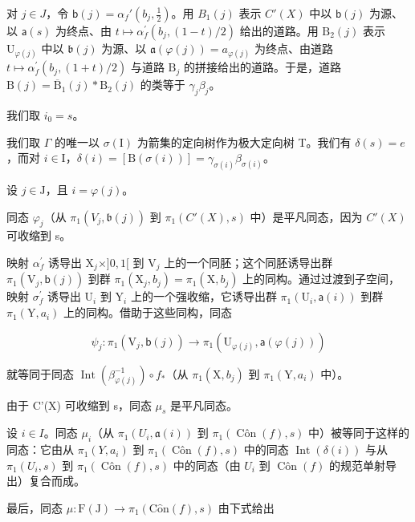 对 \(j \in J\)，令 \(\mathsf{b}(j) = \alpha_f'(b_j, \frac{1}{2})\)。用 \(B_1(j)\) 表示 \(C'(X)\) 中以 \(\mathsf{b}(j)\) 为源、以 \(\mathsf{a}(s)\) 为终点、由 \(t \mapsto \alpha_{f}^{\prime}(b_{j}, (1 - t)/2)\) 给出的道路。用 \(\mathrm{B}_{2}(j)\) 表示 \(\mathrm{U}_{\varphi(j)}\) 中以 \(\mathfrak{b}(j)\) 为源、以 \(\mathfrak{a}(\varphi(j)) = a_{\varphi(j)}\) 为终点、由道路 \(t \mapsto \alpha_{f}^{\prime}(b_{j}, (1 + t)/2)\) 与道路 \(\mathrm{B}_{j}\) 的拼接给出的道路。于是，道路 \(\mathrm{B}(j) = \overline{\mathrm{B}}_{1}(j) * \mathrm{B}_{2}(j)\) 的类等于 \(\gamma_{j}\beta_{j}\)。

我们取 \(i_{0}=s\)。

我们取 \(\Gamma\) 的唯一以 \(\sigma(\mathrm{I})\) 为箭集的定向树作为极大定向树 T。我们有 \(\delta(s) = e\)，而对 \(i \in \mathrm{I}\)，\(\delta(i) = [\mathrm{B}(\sigma(i))] = \gamma_{\sigma(i)}\beta_{\sigma(i)}\)。

设 \(j \in \mathrm{J}\)，且 \(i = \varphi(j)\)。

同态 \(\varphi_{j}\)（从 \(\pi_1(V_j, \mathfrak{b}(j))\) 到 \(\pi_1(C'(X), s)\) 中）是平凡同态，因为 \(C'(X)\) 可收缩到 s。

映射 \(\alpha_{f}^{\prime}\) 诱导出 \(\mathrm{X}_{j} \times ]0,1[\) 到 \(\mathrm{V}_{j}\) 上的一个同胚；这个同胚诱导出群 \(\pi_{1}(\mathrm{V}_{j},\mathsf{b}(j))\) 到群 \(\pi_{1}(\mathrm{X}_{j},b_{j}) = \pi_{1}(\mathrm{X},b_{j})\) 上的同构。通过过渡到子空间，映射 \(\sigma_{f}^{\prime}\) 诱导出 \(\mathrm{U}_{i}\) 到 \(\mathrm{Y}_{i}\) 上的一个强收缩，它诱导出群 \(\pi_{1}(\mathrm{U}_{i},\mathsf{a}(i))\) 到群 \(\pi_{1}(\mathrm{Y},a_{i})\) 上的同构。借助于这些同构，同态

\[
\psi_ {j} \colon \pi_ {1} (\mathrm{V} _ {j}, \mathsf {b} (j)) \to \pi_ {1} (\mathrm{U} _ {\varphi (j)}, \mathsf {a} (\varphi (j)))
\]

就等同于同态 \(\operatorname{Int}(\beta_{\varphi(j)}^{-1}) \circ f_*\)（从 \(\pi_1(\mathrm{X}, b_j)\) 到 \(\pi_1(\mathrm{Y}, a_i)\) 中）。

由于 C'(X) 可收缩到 s，同态 \(\mu_{s}\) 是平凡同态。

设 \(i \in I\)。同态 \(\mu_i\)（从 \(\pi_1(U_i, \mathfrak{a}(i))\) 到 \(\pi_1(\operatorname{Côn}(f), s)\) 中）被等同于这样的同态：它由从 \(\pi_1(Y, a_i)\) 到 \(\pi_1(\operatorname{Côn}(f), s)\) 中的同态 \(\operatorname{Int}(\delta(i))\) 与从 \(\pi_1(U_i, s)\) 到 \(\pi_1(\operatorname{Côn}(f), s)\) 中的同态（由 \(U_i\) 到 \(\operatorname{Côn}(f) \) 的规范单射导出）复合而成。

最后，同态 \(\mu\colon\mathrm{F}(\mathrm{J})\to\pi_{1}(\mathrm{C}\hat{\mathrm{o}}\mathrm{n}(f),s)\) 由下式给出

